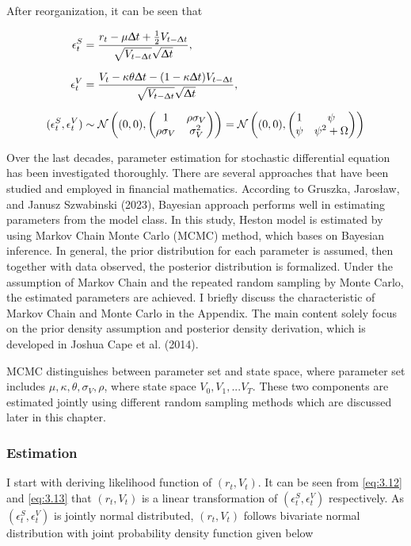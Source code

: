 \documentclass[12pt,a4paper]{article}
\numberwithin{equation}{section}
\begin{document}
After reorganization, it can be seen that

\begin{align*}
\epsilon_t^S &= \frac{r_t - \mu \Updelta t + \frac{1}{2} V_{t-\Updelta t}}{\sqrt{V_{t-\Updelta t}}\sqrt{\Updelta t}}, \\[0.6em]
\epsilon_t^V &= \frac{V_t - \kappa \theta \Updelta t - (1-\kappa \Updelta t) V_{t-\Updelta t}}{\sqrt{V_{t-\Updelta t}}\sqrt{\Updelta t}},\\[0.6em]
(\epsilon_t^S, \epsilon_t^V) &\sim \mathcal{N}\left( (0,0), \begin{pmatrix}
											1 & \rho \sigma_V\\
											\rho \sigma_V & \sigma_V^2
										    \end{pmatrix} \right) = \mathcal{N} \left((0,0) , \begin{pmatrix}
																				1 & \psi \\
																				\psi  & \psi^2 + \Omega
										    									  \end{pmatrix} \right)
\end{align*}

Over the last decades, parameter estimation for stochastic differential equation has been investigated thoroughly. There are several approaches that have been studied and employed in financial mathematics. According to Gruszka, Jarosław, and Janusz Szwabinski (2023), Bayesian approach performs well in estimating parameters from the model class. In this study, Heston model is estimated by using Markov Chain Monte Carlo (MCMC) method, which bases on Bayesian inference. In general, the prior distribution for each parameter is assumed, then together with data observed, the posterior distribution is formalized. Under the assumption of Markov Chain and the repeated random sampling by Monte Carlo, the estimated parameters are achieved. I briefly discuss the characteristic of Markov Chain and Monte Carlo in the Appendix. The main content solely focus on the prior density assumption and posterior density derivation, which is developed in Joshua Cape et al. (2014).

MCMC distinguishes between parameter set and state space, where parameter set includes $\mu, \kappa, \theta, \sigma_V, \rho$, where state space ${V_0, V_1, ...V_T}$. These two components are estimated jointly using different random sampling methods which are discussed later in this chapter.

\subsubsection{Estimation}
I start with deriving likelihood function of $(r_t, V_t)$. It can be seen from \eqref{eq:3.12} and  \eqref{eq:3.13} that $(r_t, V_t)$ is a linear transformation of $(\epsilon_t^S, \epsilon_t^V)$ respectively. As $(\epsilon_t^S, \epsilon_t^V)$ is jointly normal distributed, $(r_t, V_t)$ follows bivariate normal distribution with joint probability density function given below
\end{document}
